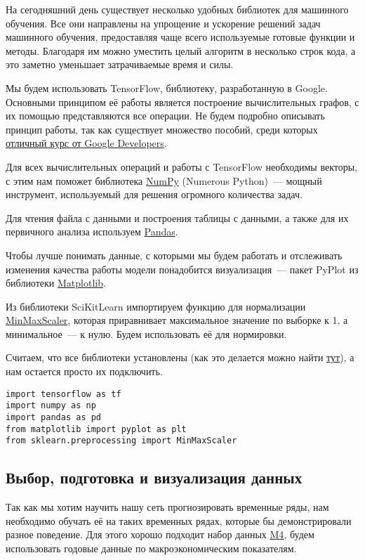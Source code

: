 \documentclass[12pt, a4paper]{article}
\begin{document}
На сегодняшний день существует несколько удобных библиотек для машинного обучения. Все они направлены на упрощение и ускорение решений задач машинного обучения, предоставляя чаще всего используемые готовые функции и методы. Благодаря им можно уместить целый алгоритм в несколько строк кода, а это заметно уменьшает затрачиваемые время и силы.

Мы будем использовать TensorFlow, библиотеку, разработанную в Google. Основными принципом её работы является построение вычислительных графов, с их помощью представляются все операции. Не будем подробно описывать принцип работы, так как существует множество пособий, среди которых \href{https://developers.google.com/machine-learning/crash-course/}{отличный курс от Google Developers}.

Для всех вычислительных операций и работы с TensorFlow необходимы векторы, с этим нам поможет библиотека \href{http://www.numpy.org/}{NumPy} (Numerous Python)~--- мощный инструмент, используемый для решения огромного количества задач.

Для чтения файла с данными и построения таблицы с данными, а также для их первичного анализа используем \href{https://pandas.pydata.org/}{Pandas}.

Чтобы лучше понимать данные, с которыми мы будем работать и отслеживать изменения качества работы модели понадобится визуализация~--- пакет PyPlot из библиотеки \href{https://matplotlib.org/}{Matplotlib}.

Из библиотеки SciKitLearn импортируем функцию для нормализации \href{http://scikit-learn.org/stable/modules/generated/sklearn.preprocessing.MinMaxScaler.html}{MinMaxScaler}, которая приравнивает максимальное значение по выборке к 1, а минимальное~--- к нулю. Будем использовать её для нормировки.

Считаем, что все библиотеки установлены (как это делается можно найти \href{https://pythonworld.ru/osnovy/pip.html}{тут}), а нам остается просто их подключить.

\begin{verbatim}
import tensorflow as tf
import numpy as np
import pandas as pd
from matplotlib import pyplot as plt
from sklearn.preprocessing import MinMaxScaler
\end{verbatim}

\subsection{Выбор, подготовка и визуализация данных}
Так как мы хотим научить нашу сеть прогнозировать временные ряды, нам необходимо обучать её на таких временных рядах, которые бы демонстрировали разное поведение. Для этого хорошо подходит набор данных \href{https://www.m4.unic.ac.cy/the-dataset/}{M4}, будем использовать годовые данные по макроэкономическим показателям.
\end{document}
